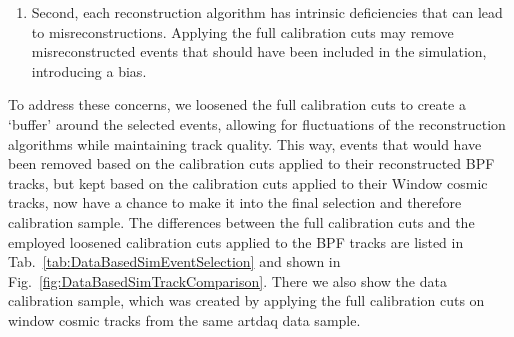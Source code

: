 \begin{enumerate}
\begin{enumerate}
\item Second, each reconstruction algorithm has intrinsic deficiencies that can lead to misreconstructions. Applying the full calibration cuts may remove misreconstructed events that should have been included in the simulation, introducing a bias.
\end{enumerate}

To address these concerns, we loosened the full calibration cuts to create a `buffer' around the selected events, allowing for fluctuations of the reconstruction algorithms while maintaining track quality. This way, events that would have been removed based on the calibration cuts applied to their reconstructed \gls{BPF} tracks, but kept based on the calibration cuts applied to their Window cosmic tracks, now have a chance to make it into the final selection and therefore calibration sample. The differences between the full calibration cuts and the employed loosened calibration cuts applied to the \gls{BPF} tracks are listed in Tab.~\ref{tab:DataBasedSimEventSelection} and shown in Fig.~\ref{fig:DataBasedSimTrackComparison}. There we also show the data calibration sample, which was created by applying the full calibration cuts on window cosmic tracks from the same artdaq data sample.
\end{enumerate}

